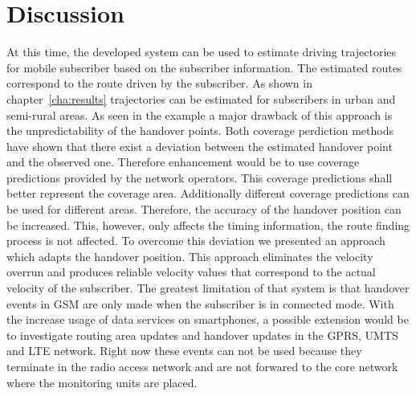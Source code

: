 \documentclass[master,english]{hgbthesis}
\begin{document}
\section{Discussion}
At this time, the developed system can be used to estimate driving trajectories for mobile subscriber based on the subscriber information. The estimated routes correspond to the route driven by the subscriber. As shown in chapter~\ref{cha:results} trajectories can be estimated for subscribers in urban and semi-rural areas. As seen in the example a major drawback of this approach is the unpredictability of the handover points. Both coverage perdiction methods have shown that there exist a deviation between the estimated handover point and the observed one. Therefore enhancement would be to use coverage predictions provided by the network operators. This coverage predictions shall better represent the coverage area. Additionally different coverage predictions can be used for different areas. Therefore, the accuracy of the handover position can be increased. This, however, only affects the timing information, the route finding process is not affected.
To overcome this deviation we presented an approach which adapts the handover position. This approach eliminates the velocity overrun and produces reliable velocity values that correspond to the actual velocity of the subscriber.
The greatest limitation of that system is that handover events in GSM are only made when the subscriber is in connected mode. With the increase usage of data services on smartphones, a possible extension would be to investigate routing area updates and handover updates in the GPRS, UMTS and LTE network. Right now these events can not be used because they terminate in the radio access network and are not forwared to the core network where the monitoring units are placed.


\MakeBibliography
\end{document}
